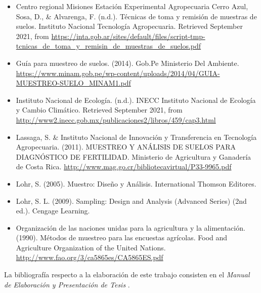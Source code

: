 \documentclass{report}
\begin{document}
\begin{itemize}
    \item Centro regional Misiones Estación Experimental Agropecuaria Cerro Azul, Sosa, D., \& Alvarenga, F. (n.d.). Técnicas de toma y remisión de muestras de suelos. Instituto Nacional Tecnología Agropecuaria. Retrieved September 2021, from \url{https://inta.gob.ar/sites/default/files/script-tmp-tcnicas_de_toma_y_remisin_de_muestras_de_suelos.pdf}
    
    \item Guía para muestreo de suelos. (2014). Gob.Pe Ministerio Del Ambiente. \url{https://www.minam.gob.pe/wp-content/uploads/2014/04/GUIA-MUESTREO-SUELO_MINAM1.pdf}
    
    \item Instituto Nacional de Ecología. (n.d.). INECC Instituto Nacional de Ecología y Cambio Climático. Retrieved September 2021, from \url{http://www2.inecc.gob.mx/publicaciones2/libros/459/cap3.html}
    
    \item Lassaga, S. \& Instituto Nacional de Innovación y Transferencia en Tecnología Agropecuaria. (2011). MUESTREO Y ANÁLISIS DE SUELOS PARA DIAGNÓSTICO DE FERTILIDAD. Ministerio de Agricultura y Ganadería de Costa Rica. \url{http://www.mag.go.cr/bibliotecavirtual/P33-9965.pdf}
    
    \item Lohr, S. (2005). Muestro: Diseño y Análisis. International Thomson Editores.
    
    \item Lohr, S. L. (2009). Sampling: Design and Analysis (Advanced Series) (2nd ed.). Cengage Learning.
    
    \item Organización de las naciones unidas para la agricultura y la alimentación. (1990). Métodos de muestreo para las encuestas agrícolas. Food and Agriculture Organization of the United Nations. \url{http://www.fao.org/3/ca5865es/CA5865ES.pdf}
\end{itemize}

La bibliografía respecto a la elaboración de este trabajo consisten en el \textit{Manual de Elaboración y Presentación de Tesis} \cite{universidad-san-carlos-2016}.

\printbibliography
\end{document}
